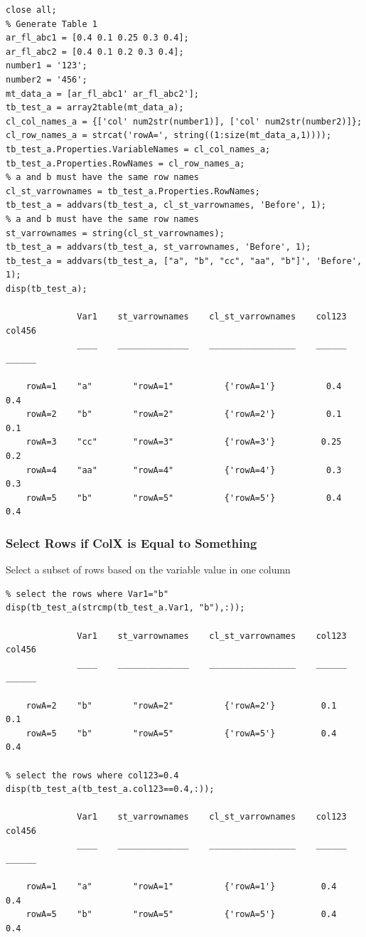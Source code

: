 \documentclass[
]{book}
\begin{document}
\begin{verbatim}
close all;
% Generate Table 1
ar_fl_abc1 = [0.4 0.1 0.25 0.3 0.4];
ar_fl_abc2 = [0.4 0.1 0.2 0.3 0.4];
number1 = '123';
number2 = '456';
mt_data_a = [ar_fl_abc1' ar_fl_abc2'];
tb_test_a = array2table(mt_data_a);
cl_col_names_a = {['col' num2str(number1)], ['col' num2str(number2)]};
cl_row_names_a = strcat('rowA=', string((1:size(mt_data_a,1))));
tb_test_a.Properties.VariableNames = cl_col_names_a;
tb_test_a.Properties.RowNames = cl_row_names_a;
% a and b must have the same row names
cl_st_varrownames = tb_test_a.Properties.RowNames;
tb_test_a = addvars(tb_test_a, cl_st_varrownames, 'Before', 1);
% a and b must have the same row names
st_varrownames = string(cl_st_varrownames);
tb_test_a = addvars(tb_test_a, st_varrownames, 'Before', 1);
tb_test_a = addvars(tb_test_a, ["a", "b", "cc", "aa", "b"]', 'Before', 1);
disp(tb_test_a);

              Var1    st_varrownames    cl_st_varrownames    col123    col456
              ____    ______________    _________________    ______    ______

    rowA=1    "a"        "rowA=1"          {'rowA=1'}          0.4      0.4  
    rowA=2    "b"        "rowA=2"          {'rowA=2'}          0.1      0.1  
    rowA=3    "cc"       "rowA=3"          {'rowA=3'}         0.25      0.2  
    rowA=4    "aa"       "rowA=4"          {'rowA=4'}          0.3      0.3  
    rowA=5    "b"        "rowA=5"          {'rowA=5'}          0.4      0.4  
\end{verbatim}

\hypertarget{select-rows-if-colx-is-equal-to-something}{%
\subsubsection{Select Rows if ColX is Equal to Something}\label{select-rows-if-colx-is-equal-to-something}}

Select a subset of rows based on the variable value in one column

\begin{verbatim}
% select the rows where Var1="b"
disp(tb_test_a(strcmp(tb_test_a.Var1, "b"),:));

              Var1    st_varrownames    cl_st_varrownames    col123    col456
              ____    ______________    _________________    ______    ______

    rowA=2    "b"        "rowA=2"          {'rowA=2'}         0.1       0.1  
    rowA=5    "b"        "rowA=5"          {'rowA=5'}         0.4       0.4  

% select the rows where col123=0.4
disp(tb_test_a(tb_test_a.col123==0.4,:));

              Var1    st_varrownames    cl_st_varrownames    col123    col456
              ____    ______________    _________________    ______    ______

    rowA=1    "a"        "rowA=1"          {'rowA=1'}         0.4       0.4  
    rowA=5    "b"        "rowA=5"          {'rowA=5'}         0.4       0.4
\end{verbatim}
\end{document}
